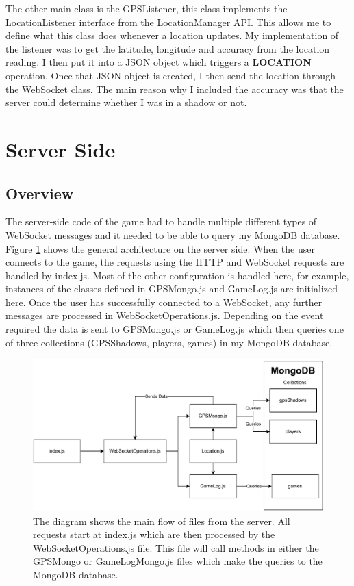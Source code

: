 \documentclass{l4proj}
\begin{document}
The other main class is the GPSListener, this class implements the LocationListener interface from the LocationManager
API. This allows me to define what this class does whenever a location updates. My implementation of the listener was
to get the latitude, longitude and accuracy from the location reading. I then put it into a JSON object which triggers a
\textbf{LOCATION} operation. Once that JSON object is created, I then send the location through the WebSocket class. The main reason why
I included the accuracy was that the server could determine whether I was in a shadow or not.


\section{Server Side}
\label{serverside_imp}

\subsection{Overview}
\label{serverOverview}
The server-side code of the game had to handle multiple different types of WebSocket messages and it needed
to be able to query my MongoDB database. Figure \ref{fig:serverSideOverview} shows the general architecture
on the server side. When the user connects to the game, the requests using the HTTP and WebSocket requests
are handled by index.js. Most of the other configuration is handled here, for example, instances of the classes
defined in GPSMongo.js and GameLog.js are initialized here. Once the user has successfully connected to a WebSocket,
any further messages are processed in WebSocketOperations.js. Depending on the event required the data is sent
to GPSMongo.js or GameLog.js which then queries one of three collections (GPSShadows, players, games) in my MongoDB database.

\begin{figure}
    \centering
    \includegraphics[width=\linewidth]{images/serverSideOverview.pdf}    

    \caption{
        The diagram shows the main flow of files from the server. All requests start at index.js which are
        then processed by the WebSocketOperations.js file. This file will call methods in either the GPSMongo
        or GameLogMongo.js files which make the queries to the MongoDB database.  
    }

    \label{fig:serverSideOverview} 
\end{figure}
\end{document}
